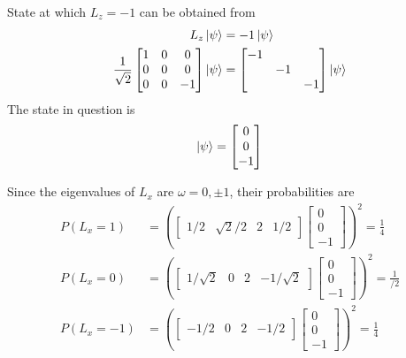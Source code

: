 \documentclass[../../../main.tex]{subfiles}
\begin{document}
State at which $L_z=-1$ can be obtained from 
\begin{align*}
    L_z \ket{\psi}&=-  1 \ket{\psi}\\
    \frac{1 }{\sqrt{2 }}\begin{bmatrix}
        1&0&0\\
        0&0&0\\
        0&0&-1\\
    \end{bmatrix}
    \ket{\psi} &= 
    \begin{bmatrix}
        -1&&\\
        &-1&\\
        &&-1\\
    \end{bmatrix}
    \ket{\psi}
\end{align*}
The state in question is 
\begin{equation*}
    \ket{\psi}=
    \begin{bmatrix}
        0\\0\\-1\\
    \end{bmatrix}
\end{equation*}

Since the eigenvalues of $L_x$ are $\omega=0,\pm 1$, their probabilities are 
\begin{align*}
    P(L_x=1) &= \left( 
    \begin{bmatrix}
        1/2&\sqrt{2}/2&2&1/2
    \end{bmatrix} 
    \begin{bmatrix}
        0\\0\\-1
    \end{bmatrix}
    \right) ^2=\frac{1 }{4}\\
    P(L_x=0) &= \left( 
    \begin{bmatrix}
        1/\sqrt{2}&0&2&-1/\sqrt{2}
    \end{bmatrix} 
    \begin{bmatrix}
        0\\0\\-1
    \end{bmatrix}
    \right) ^2=\frac{1 }{/2}\\
    P(L_x=-1) &= \left( 
    \begin{bmatrix}
        -1/2&0&2&-1/2
    \end{bmatrix} 
    \begin{bmatrix}
        0\\0\\-1
    \end{bmatrix}
    \right) ^2=\frac{1 }{4}\\
\end{align*}
\end{document}
